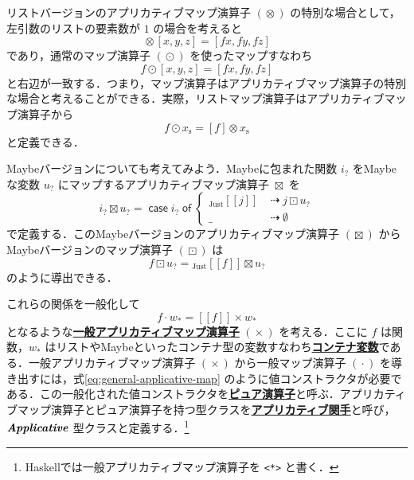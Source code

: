 \documentclass[a5paper,twoside,fleqn,draft]{jsbook}
\def\[{[\![}
\def\]{]\!]}
\newcommand{\programminglanguage}[1]{\textsf{#1}}
\newcommand{\haskell}{\programminglanguage{Haskell}}
\newcommand{\keyword}[1]{{\underline{\textbf{#1}}}}
\newcommand{\code}[1]{\texttt{#1}}
\newcommand{\mKeyword}[1]{\mathsf{#1}}
\newcommand{\mIfKeyword}{\mKeyword{if}}
\newcommand{\mCaseKeyword}{\mKeyword{case}}
\newcommand{\mOfKeyword}{\mKeyword{of}}
\newcommand{\mOtherwiseKeyword}{\mKeyword{otherwise}}
\DeclareMathOperator{\mCaseKW}{\mCaseKeyword}
\DeclareMathOperator{\mIf}{\mIfKeyword}
\DeclareMathOperator{\mOfKW}{\mOfKeyword}
\DeclareMathOperator{\mOtherwise}{\mOtherwiseKeyword}
\newcommand{\mNothing}{\emptyset}
\DeclareMathOperator{\mAppMap}{\times}
\DeclareMathOperator{\mAppMapList}{\otimes}
\DeclareMathOperator{\mAppMapMaybe}{\boxtimes}
\DeclareMathOperator{\mIfSo}{\dashrightarrow}
\DeclareMathOperator{\mLogicalAnd}{\wedge}
\DeclareMathOperator{\mMap}{\cdot}
\DeclareMathOperator{\mMapList}{\odot}
\DeclareMathOperator{\mMapMaybe}{\boxdot}
\newcommand{\mValueConstructor}[1]{\mathrm{#1}}
\newcommand{\mValueWith}[2]{{}_\mValueConstructor{#1}\[#2\]}
\newcommand{\mJustWith}[1]{\mValueWith{Just}{#1}}
\newcommand{\mPureWith}[1]{\[#1\]}
\newcommand{\mTypeClass}[1]{\textbf{\textit{#1}}}
\newcommand{\mApplicativeTypeClass}{\mTypeClass{Applicative}}
\newcommand{\mList}[1]{{#1}_\mathrm{s}}
\newcommand{\mMaybe}[1]{{#1}_?}
\newcommand{\mContainer}[1]{{#1}_*}
\newcommand{\mCaseOf}[1]{\mCaseKW#1\mOfKW}
\begin{document}
リストバージョンのアプリカティブマップ演算子 $(\mAppMapList)$ の特別な場合として，左引数のリストの要素数が $1$ の場合を考えると
\begin{equation}
  [f]\mAppMapList{}[x,y,z]
  =[fx,fy,fz]
\end{equation}
であり，通常のマップ演算子 $(\mMapList)$ を使ったマップすなわち
\begin{equation}
  f\mMapList{}[x,y,z]
  =[fx,fy,fz]
\end{equation}
と右辺が一致する．つまり，マップ演算子はアプリカティブマップ演算子の特別な場合と考えることができる．実際，リストマップ演算子はアプリカティブマップ演算子から
\begin{equation}
  f\mMapList\mList{x}
  =[f]\mAppMapList\mList{x}
\end{equation}
と定義できる．

Maybeバージョンについても考えてみよう．Maybeに包まれた関数 $\mMaybe{i}$ をMaybeな変数 $\mMaybe{u}$ にマップするアプリカティブマップ演算子
$\mAppMapMaybe$ を
\begin{equation}
  \mMaybe{i}\mAppMapMaybe\mMaybe{u}
  =\mCaseOf{\mMaybe{i}}
  \begin{cases}
    \mJustWith{j}
    &\mIfSo j\mMapMaybe\mMaybe{u}\\
    \_
    &\mIfSo\mNothing
  \end{cases}
\end{equation}
で定義する．このMaybeバージョンのアプリカティブマップ演算子 $(\mAppMapMaybe)$ からMaybeバージョンのマップ演算子 $(\mMapMaybe)$ は
\begin{equation}
  f\mMapMaybe\mMaybe{u}
  =\mJustWith{f}\mAppMapMaybe\mMaybe{u}
\end{equation}
のように導出できる．

これらの関係を一般化して
\begin{equation}
  \label{eq:general-applicative-map}
  f\mMap\mContainer{w}
  =\mPureWith{f}\mAppMap\mContainer{w}
\end{equation}
となるような\keyword{一般アプリカティブマップ演算子} $(\mAppMap)$ を考える．ここに $f$ は関数，$\mContainer{w}$ はリストやMaybeといったコンテナ型の変数すなわち\keyword{コンテナ変数}である．一般アプリカティブマップ演算子 $(\mAppMap)$ から一般マップ演算子 $(\mMap)$ を導き出すには，式\eqref{eq:general-applicative-map} のように値コンストラクタが必要である．この一般化された値コンストラクタを\keyword{ピュア演算子}と呼ぶ．アプリカティブマップ演算子とピュア演算子を持つ型クラスを\keyword{アプリカティブ関手}と呼び，$\mApplicativeTypeClass$ 型クラスと定義する．\footnote{\haskell では一般アプリカティブマップ演算子を \code{<*>} と書く．}
\end{document}
